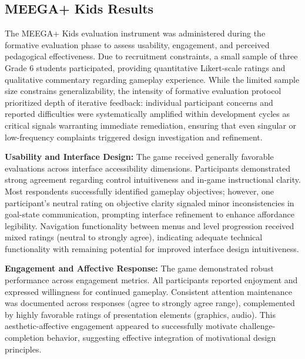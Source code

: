 \subsection{MEEGA+ Kids Results}

The MEEGA+ Kids evaluation instrument was administered during the formative evaluation phase to assess usability, engagement, and perceived pedagogical effectiveness. Due to recruitment constraints, a small sample of three Grade 6 students participated, providing quantitative Likert-scale ratings and qualitative commentary regarding gameplay experience. While the limited sample size constrains generalizability, the intensity of formative evaluation protocol prioritized depth of iterative feedback: individual participant concerns and reported difficulties were systematically amplified within development cycles as critical signals warranting immediate remediation, ensuring that even singular or low-frequency complaints triggered design investigation and refinement.

\textbf{Usability and Interface Design:} The game received generally favorable evaluations across interface accessibility dimensions. Participants demonstrated strong agreement regarding control intuitiveness and in-game instructional clarity. Most respondents successfully identified gameplay objectives; however, one participant's neutral rating on objective clarity signaled minor inconsistencies in goal-state communication, prompting interface refinement to enhance affordance legibility. Navigation functionality between menus and level progression received mixed ratings (neutral to strongly agree), indicating adequate technical functionality with remaining potential for improved interface design intuitiveness.

\textbf{Engagement and Affective Response:} The game demonstrated robust performance across engagement metrics. All participants reported enjoyment and expressed willingness for continued gameplay. Consistent attention maintenance was documented across responses (agree to strongly agree range), complemented by highly favorable ratings of presentation elements (graphics, audio). This aesthetic-affective engagement appeared to successfully motivate challenge-completion behavior, suggesting effective integration of motivational design principles.

